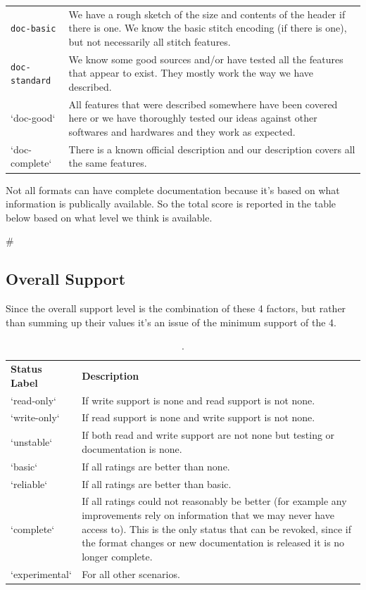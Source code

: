 \documentclass[a4paper]{report}
\begin{document}
{{{{{{{{{\begin{longtable}{p{4cm} p{8cm}}
\texttt{doc-basic} &
We have a rough sketch of the size and contents of the header if there is one.
We know the basic stitch encoding (if there is one), but not necessarily all
stitch features. \\

\texttt{doc-standard} &
We know some good sources and/or have tested all the features that appear to
exist. They mostly work the way we have described. \\

`doc-good` &
All features that were described somewhere have been covered here or we have
thoroughly tested our ideas against other softwares and hardwares and they work
as expected. \\

`doc-complete` &
There is a known official description and our description covers all the same
features.
\end{longtable}

Not all formats can have complete documentation because it's based on what
information is publically available. So the total score is reported in the table
below based on what level we think is available.

#\subsection{Overall Support}

Since the overall support level is the combination of these
4 factors, but rather than summing up their values it's an
issue of the minimum support of the 4.

\begin{table}
\begin{tabular}{l l}
\textbf{Status Label} &
\textbf{Description}
\\
`read-only` &
If write support is none and read support is not none.
\\
`write-only` &
If read support is none and write support is not none.
\\
`unstable` &
If both read and write support are not none but testing or documentation is none.
\\
`basic` &
If all ratings are better than none.
\\
`reliable` &
If all ratings are better than basic.
\\
`complete` &
If all ratings could not reasonably be better (for example any improvements
rely on information that we may never have access to). This is the only status
that can be revoked, since if the format changes or new documentation is
released it is no longer complete.
\\
`experimental` &
For all other scenarios.
\end{tabular}
\caption{.}
\end{table}

}}}}}}}}}
\end{document}
